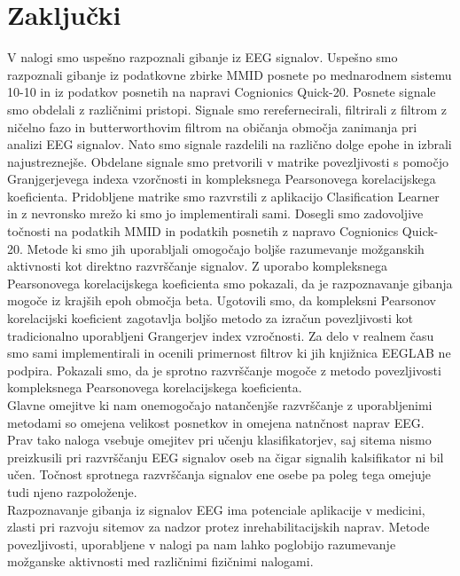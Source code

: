 \chapter{Zaključki}
V nalogi smo uspešno razpoznali gibanje iz EEG signalov. Uspešno smo razpoznali gibanje iz podatkovne zbirke MMID posnete po mednarodnem sistemu 10-10 in iz podatkov posnetih na napravi Cognionics Quick-20. Posnete signale smo obdelali z različnimi pristopi. Signale smo rerefernecirali, filtrirali z filtrom z ničelno fazo in butterworthovim filtrom na običanja območja zanimanja pri analizi EEG signalov. Nato smo signale razdelili na različno dolge epohe in izbrali najustreznejše. Obdelane signale smo pretvorili v matrike povezljivosti s pomočjo Granjgerjevega indexa vzorčnosti in kompleksnega Pearsonovega korelacijskega koeficienta. Pridobljene matrike smo razvrstili z aplikacijo Clasification Learner in z nevronsko mrežo ki smo jo implementirali sami. Dosegli smo zadovoljive točnosti na podatkih MMID in podatkih posnetih z napravo Cognionics Quick-20. Metode ki smo jih uporabljali omogočajo boljše razumevanje možganskih aktivnosti kot direktno razvrščanje signalov. Z uporabo kompleksnega Pearsonovega korelacijskega koeficienta smo pokazali, da je razpoznavanje gibanja mogoče iz krajših epoh območja beta. Ugotovili smo, da kompleksni Pearsonov korelacijski koeficient zagotavlja boljšo metodo za izračun povezljivosti kot tradicionalno uporabljeni Grangerjev index vzročnosti. Za delo v realnem času smo sami implementirali in ocenili primernost filtrov ki jih knjižnica EEGLAB ne podpira. Pokazali smo, da je sprotno razvrščanje mogoče z metodo povezljivosti kompleksnega Pearsonovega korelacijskega koeficienta.\\
Glavne omejitve ki nam onemogočajo natančenjše razvrščanje z uporabljenimi metodami so omejena velikost posnetkov in omejena natnčnost naprav EEG. Prav tako naloga vsebuje omejitev pri učenju klasifikatorjev, saj sitema nismo preizkusili pri razvrščanju EEG signalov oseb na čigar signalih kalsifikator ni bil učen. Točnost sprotnega razvrščanja signalov ene osebe pa poleg tega omejuje tudi njeno razpoloženje.\\
Razpoznavanje gibanja iz signalov EEG ima potenciale aplikacije v medicini, zlasti pri razvoju sitemov za nadzor protez inrehabilitacijskih naprav. Metode povezljivosti, uporabljene v nalogi pa nam lahko poglobijo razumevanje možganske aktivnosti med različnimi fizičnimi nalogami.